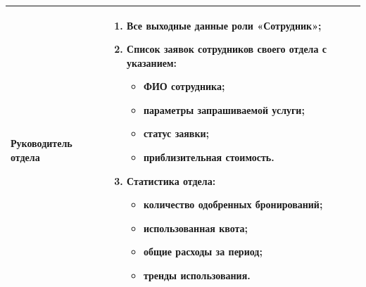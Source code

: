 \documentclass{bmstu}
\begin{document}
\begin{longtable}{|p{}|p{}|}
Руководитель отдела & 
\begin{enumerate}
    \item Все выходные данные роли «Сотрудник»;
    \item Список заявок сотрудников своего отдела с указанием:
    \begin{itemize}
        \item ФИО сотрудника;
        \item параметры запрашиваемой услуги;
        \item статус заявки;
        \item приблизительная стоимость.
    \end{itemize}
    \item Статистика отдела:
    \begin{itemize}
        \item количество одобренных бронирований;
        \item использованная квота;
        \item общие расходы за период;
        \item тренды использования.
    \end{itemize}
\end{enumerate} \\
\hline


\end{longtable}
\end{document}
